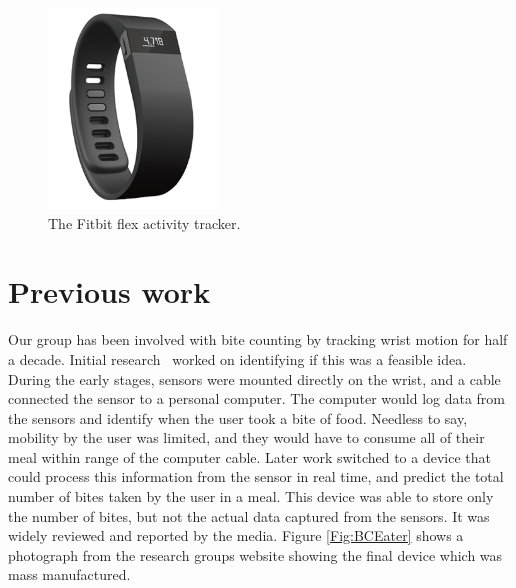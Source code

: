 \begin{figure}
\begin{center}
\includegraphics[width=0.4\textwidth]{images/JawFit.png}
\caption{The Fitbit flex activity tracker.}
\label{fig:FitbitJawbone}
\end{center}
\end{figure}

\section{Previous work}
Our group has been involved with bite counting by tracking wrist motion for half a decade.
Initial research~\cite{dong2012new} worked on identifying if this was a feasible idea.
During the early stages,
sensors were mounted directly on the wrist,
and a cable connected the sensor to a personal computer.
The computer would log data from the sensors and identify when the user took a bite of food.
Needless to say,
mobility by the user was limited,
and they would have to consume all of their meal within range of the computer cable.
Later work switched to a device that could process this information from the sensor in real time,
and predict the total number of bites taken by the user in a meal.
This device was able to store only the number of bites, 
but not the actual data captured from the sensors.
It was widely reviewed and reported by the media.
Figure \ref{Fig:BCEater} shows a photograph from the research groups website showing the final device which was mass manufactured.

